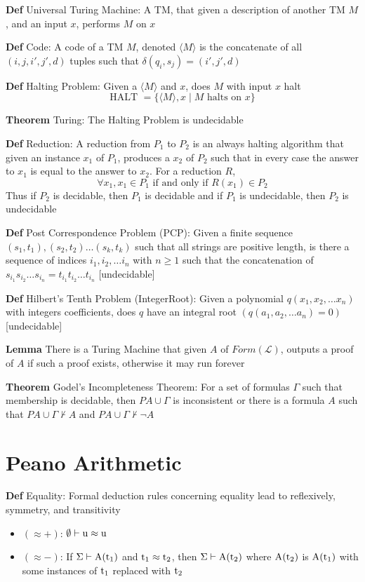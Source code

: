\documentclass[11pt,notitlepage]{report}
\newcommand{\mc}[1]{\ensuremath{\mathcal{#1}}}
\newcommand{\tbf}[1]{\textbf{#1}}
\begin{document}
\tbf{Def} Universal Turing Machine: A TM, that given a description of another TM $M$, and an input $x$, performs $M$ on $x$

\tbf{Def} Code: A code of a TM $M$, denoted $\langle M \rangle$ is the concatenate of all $(i, j, i', j', d)$ tuples such that $\delta(q_i, s_j) = (i', j', d)$

\tbf{Def} Halting Problem: Given a $\langle M \rangle$ and $x$, does $M$ with input $x$ halt
$$\text{HALT }=\{\langle M \rangle, x \mid M \text{ halts on }x\}$$

\tbf{Theorem} Turing: The Halting Problem is undecidable

\tbf{Def} Reduction: A reduction from $P_1$ to $P_2$ is an always halting algorithm that given an instance $x_1$ of $P_1$, produces a $x_2$ of $P_2$ such that in every case the answer to $x_1$ is equal to the answer to $x_2$. For a reduction $R$, 
$$\forall x_1, x_1 \in P_1 \text{ if and only if }R(x_1) \in P_2$$
Thus if $P_2$ is decidable, then $P_1$ is decidable and if $P_1$ is undecidable, then $P_2$ is undecidable 

\tbf{Def} Post Correspondence Problem (PCP): Given a finite sequence $(s_1, t_1), (s_2, t_2) \dots (s_k, t_k)$ such that all strings are positive length, is there a sequence of indices $i_1, i_2, \dots i_n$ with $n \geq 1$ such that the concatenation of $s_{i_1}s_{i_2}\dots s_{i_n} = t_{i_1}t_{i_2}\dots t_{i_n}$ [undecidable]

\tbf{Def} Hilbert's Tenth Problem (IntegerRoot): Given a polynomial $q(x_1, x_2, \dots x_n)$ with integers coefficients, does $q$ have an integral root $\left(q(a_1,a_2,\dots a_n) = 0\right)$ [undecidable]

\tbf{Lemma} There is a Turing Machine that given $A$ of $Form(\mc L)$, outputs a proof of $A$ if such a proof exists, otherwise it may run forever

\tbf{Theorem} Godel's Incompleteness Theorem: For a set of formulas $\Gamma$ such that membership is decidable, then $PA \cup \Gamma$ is inconsistent or there is a formula $A$ such that $PA \cup \Gamma \not \vdash A$ and $PA \cup \Gamma \not \vdash \neg A$


\newpage
\section{Peano Arithmetic}

\tbf{Def} Equality: Formal deduction rules concerning equality lead to reflexively, symmetry, and transitivity
\begin{itemize}
    \item $(\approx +)$: $\emptyset \vdash \rm u \approx u$
    \item $(\approx -)$: If $\Sigma \vdash \rm A(t_1)$ and $\rm t_1 \approx t_2$, then $\Sigma \vdash \rm A(t_2)$ where $\rm A(t_2)$ is $\rm A(t_1)$ with some instances of $\rm t_1$ replaced with $\rm t_2$
\end{itemize}
\end{document}
